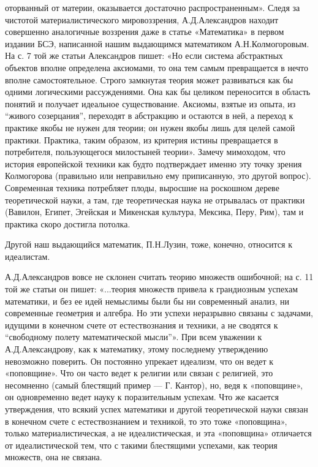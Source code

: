 оторванный  от  материи,   оказывается  достаточно  распространенным».
Следя за  чистотой материалистического  мировоззрения, А.Д.Александров
находит совершенно  аналогичные воззрения  даже в  статье «Математика»
в  первом   издании  БСЭ,  написанной  нашим   выдающимся  математиком
А.Н.Колмогоровым. На  с. 7 той  же статьи Александров пишет:  «Но если
система абстрактных  объектов вполне определена аксиомами,  то она тем
самым превращается  в нечто  вполне самостоятельное.  Строго замкнутая
теория может развиваться как  бы одними логическими рассуждениями. Она
как  бы целиком  переносится в  область понятий  и получает  идеальное
существование.  Аксиомы, взятые  из опыта,  из ``живого  созерцания'',
переходят  в  абстракцию  и  остаются  в ней,  а  переход  к  практике
якобы  не нужен  для  теории;  он нужен  якобы  лишь  для целей  самой
практики. Практика,  таким образом, из критерия  истины превращается в
потребителя, пользующегося  милостыней теории». Замечу  мимоходом, что
история европейской  техники как  будто подтверждает именно  эту точку
зрения  Колмогорова (правильно  или неправильно  ему приписанную,  это
другой  вопрос). Современная  техника  потребляет  плоды, выросшие  на
роскошном дереве  теоретической науки, а там,  где теоретическая наука
не  отрывалась  от практики  (Вавилон,  Египет,  Эгейская и  Микенская
культура, Мексика, Перу, Рим), там и практика скоро достигла потолка.

Другой наш выдающийся математик, П.Н.Лузин, тоже, конечно, относится к
идеалистам.

А.Д.Александров вовсе  не склонен  считать теорию  множеств ошибочной;
на  с. 11  той  же  статьи он  пишет:  «...теория  множеств привела  к
грандиозным успехам  математики, и  без ее идей  немыслимы были  бы ни
современный  анализ,  ни  современные  геометрия  и  алгебра.  Но  эти
успехи  неразрывно  связаны  с  задачами,  идущими  в  конечном  счете
от  естествознания и  техники,  а не  сводятся  к ``свободному  полету
математической мысли''».  При всем уважении к  А.Д.Александрову, как к
математику,  этому  последнему  утверждению  невозможно  поверить.  Он
постоянно упрекает идеализм, что он  ведет к «поповщине». Что он часто
ведет к религии или связан с религией, это несомненно (самый блестящий
пример --- Г.  Кантор), но, ведя к «поповщине»,  он одновременно ведет
науку к поразительным успехам. Что же касается утверждения, что всякий
успех  математики  и  другой  теоретической науки  связан  в  конечном
счете с  естествознанием и техникой,  то это тоже  «поповщина», только
материалистическая, а не идеалистическая, и эта «поповщина» отличается
от идеалистической тем,  что с такими блестящими  успехами, как теория
множеств, она не связана.

